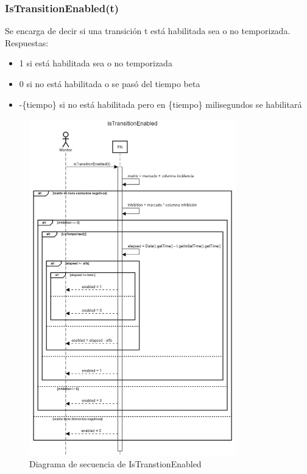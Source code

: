 \documentclass[a4paper,11pt]{article}
\begin{document}
    \subsubsection{IsTransitionEnabled(t)}
    Se encarga de decir si una transición t está habilitada sea o no temporizada.
    Respuestas:
    \begin{itemize}
        \item 1 si está habilitada sea o no temporizada
        \item 0 si no está habilitada o se pasó del tiempo beta
        \item -\{tiempo\} si no está habilitada pero en \{tiempo\} milisegundos se habilitará
    \end{itemize} 
    \begin{figure}[H]
        \centering
        \includegraphics[width=0.8\textwidth]{sequence_diag/exports/IsTranstionEnabled.png}
        \caption{Diagrama de secuencia de IsTranstionEnabled}
        \label{fig:seq_IsTranstionEnabled}
    \end{figure}
\end{document}
